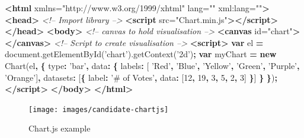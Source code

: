 \documentclass[10pt,]{krantz}
\makeatletter
\newenvironment{Shaded}{\begin{snugshade}}{\end{snugshade}}
\newcommand{\AttributeTok}[1]{\textcolor[rgb]{0.61,0.61,0.61}{#1}}
\newcommand{\CommentTok}[1]{\textcolor[rgb]{0.37,0.37,0.37}{\textit{#1}}}
\newcommand{\DataTypeTok}[1]{\textcolor[rgb]{0.27,0.27,0.27}{#1}}
\newcommand{\DecValTok}[1]{\textcolor[rgb]{0.06,0.06,0.06}{#1}}
\newcommand{\KeywordTok}[1]{\textcolor[rgb]{0.27,0.27,0.27}{\textbf{#1}}}
\newcommand{\NormalTok}[1]{#1}
\newcommand{\OperatorTok}[1]{\textcolor[rgb]{0.43,0.43,0.43}{\textbf{#1}}}
\newcommand{\OtherTok}[1]{\textcolor[rgb]{0.37,0.37,0.37}{#1}}
\newcommand{\StringTok}[1]{\textcolor[rgb]{0.5,0.5,0.5}{#1}}
\newcommand{\VariableTok}[1]{\textcolor[rgb]{0,0,0}{#1}}
\newenvironment{kframe}{%
\medskip{}
\setlength{\fboxsep}{.8em}
 \def\at@end@of@kframe{}%
 \ifinner\ifhmode%
  \def\at@end@of@kframe{\end{minipage}}%
  \begin{minipage}{\columnwidth}%
 \fi\fi%
 \def\FrameCommand##1{\hskip\@totalleftmargin \hskip-\fboxsep
 \colorbox{shadecolor}{##1}\hskip-\fboxsep
     \hskip-\linewidth \hskip-\@totalleftmargin \hskip\columnwidth}%
 \MakeFramed {\advance\hsize-\width
   \@totalleftmargin\z@ \linewidth\hsize
   \@setminipage}}%
 {\par\unskip\endMakeFramed%
 \at@end@of@kframe}
\renewenvironment{Shaded}{\begin{kframe}}{\end{kframe}}
\makeatother
\begin{document}
\begin{Shaded}
\begin{Highlighting}[]
\KeywordTok{<html}\OtherTok{ xmlns=}\StringTok{"http://www.w3.org/1999/xhtml"}\OtherTok{ lang=}\StringTok{""}\OtherTok{ xml:lang=}\StringTok{""}\KeywordTok{>}
\KeywordTok{<head>}
  \CommentTok{<!-- Import library -->}
  \KeywordTok{<script}\OtherTok{ src=}\StringTok{"Chart.min.js"}\KeywordTok{></script>}
\KeywordTok{</head>}
\KeywordTok{<body>}
  \CommentTok{<!-- canvas to hold visualisation -->}
  \KeywordTok{<canvas}\OtherTok{ id=}\StringTok{"chart"}\KeywordTok{></canvas>}
  \CommentTok{<!-- Script to create visualisation -->}
  \KeywordTok{<script>}
    \KeywordTok{var}\NormalTok{ el }\OperatorTok{=} \VariableTok{document}\NormalTok{.}\AttributeTok{getElementById}\NormalTok{(}\StringTok{'chart'}\NormalTok{).}\AttributeTok{getContext}\NormalTok{(}\StringTok{'2d'}\NormalTok{)}\OperatorTok{;}    
    \KeywordTok{var}\NormalTok{ myChart }\OperatorTok{=} \KeywordTok{new} \AttributeTok{Chart}\NormalTok{(el}\OperatorTok{,} \OperatorTok{\{}
      \DataTypeTok{type}\OperatorTok{:} \StringTok{'bar'}\OperatorTok{,}
      \DataTypeTok{data}\OperatorTok{:} \OperatorTok{\{}
        \DataTypeTok{labels}\OperatorTok{:}\NormalTok{ [}
          \StringTok{'Red'}\OperatorTok{,} \StringTok{'Blue'}\OperatorTok{,} \StringTok{'Yellow'}\OperatorTok{,} \StringTok{'Green'}\OperatorTok{,} 
          \StringTok{'Purple'}\OperatorTok{,} \StringTok{'Orange'}\NormalTok{]}\OperatorTok{,}
        \DataTypeTok{datasets}\OperatorTok{:}\NormalTok{ [}\OperatorTok{\{}
          \DataTypeTok{label}\OperatorTok{:} \StringTok{'# of Votes'}\OperatorTok{,}
          \DataTypeTok{data}\OperatorTok{:}\NormalTok{ [}\DecValTok{12}\OperatorTok{,} \DecValTok{19}\OperatorTok{,} \DecValTok{3}\OperatorTok{,} \DecValTok{5}\OperatorTok{,} \DecValTok{2}\OperatorTok{,} \DecValTok{3}\NormalTok{]}
        \OperatorTok{\}}\NormalTok{]}
      \OperatorTok{\}}
    \OperatorTok{\}}\NormalTok{)}\OperatorTok{;}
  \KeywordTok{</script>}
\KeywordTok{</body>}
\KeywordTok{</html>}
\end{Highlighting}
\end{Shaded}

\begin{figure}[H]

{\centering \texttt{[image: images/candidate-chartjs]} 

}

\caption{Chart.js example}\label{fig:candidate-chartjs}
\end{figure}
\end{document}
